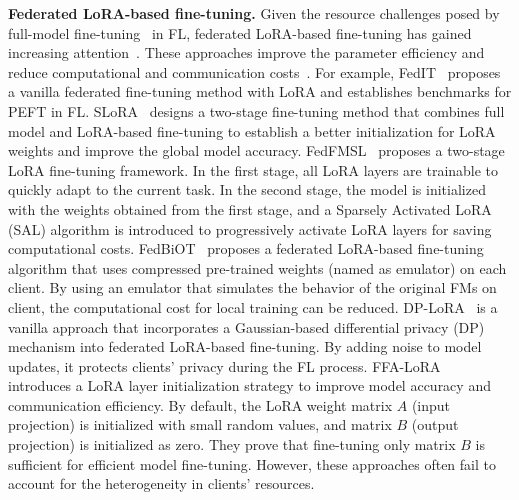\documentclass[lettersize,journal]{IEEEtran}
\begin{document}
{\textbf{Federated LoRA-based fine-tuning.} 
Given the resource challenges posed by full-model fine-tuning~\cite{li2023fedtp} in FL, federated LoRA-based fine-tuning has gained increasing attention~\cite{liu2023differentially,zhang2023towards,babakniya2023slora,wu2024fedfmsl,wu2024fedbiot,sun2024improving,gao2025flowertune}. These approaches improve the parameter efficiency and reduce computational and communication costs~\cite{yu2023federated, zhuang2023foundation}.
%
%
For example, FedIT~\cite{zhang2023towards} proposes a vanilla federated fine-tuning method with LoRA and establishes benchmarks for PEFT in FL.
SLoRA~\cite{babakniya2023slora} designs a two-stage fine-tuning method that combines full model and LoRA-based fine-tuning to establish a better initialization for LoRA weights and improve the global model accuracy. 
FedFMSL~\cite{wu2024fedfmsl} proposes a two-stage LoRA fine-tuning framework. In the first stage, all LoRA layers are trainable to quickly adapt to the current task. In the second stage, the model is initialized with the weights obtained from the first stage, and a Sparsely Activated LoRA (SAL) algorithm is introduced to progressively activate LoRA layers for saving computational costs.
FedBiOT~\cite{wu2024fedbiot} proposes a federated LoRA-based fine-tuning algorithm that uses compressed pre-trained weights (named as emulator) on each client. By using an emulator that simulates the behavior of the original FMs on client, the computational cost for local training can be reduced.
DP-LoRA~\cite{liu2023differentially} is a vanilla approach that incorporates a Gaussian-based differential privacy (DP) mechanism into federated LoRA-based fine-tuning. By adding noise to model updates, it protects clients' privacy during the FL process.
FFA-LoRA~\cite{sun2024improving} introduces a LoRA layer initialization strategy to improve model accuracy and communication efficiency. By default, the LoRA weight matrix $A$ (input projection) is initialized with small random values, and matrix $B$ (output projection) is initialized as zero. They prove that fine-tuning only matrix $B$ is sufficient for efficient model fine-tuning.
However, these approaches often fail to account for the heterogeneity in clients' resources.}
\end{document}
